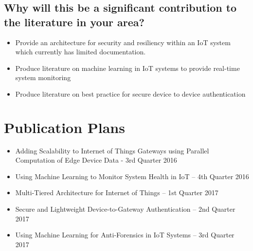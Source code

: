 \documentclass[../main.tex]{subfiles}
\begin{document}
\section{Why will this be a significant contribution to the literature in your area?}

\begin{itemize}
    \item Provide an architecture for security and resiliency within an IoT system which currently has limited documentation.
    \item Produce literature on machine learning in IoT systems to provide real-time system monitoring
    \item Produce literature on best practice for secure device to device authentication
\end{itemize}


\chapter{Publication Plans}

\begin{itemize}
    \item Adding Scalability to Internet of Things Gateways using Parallel Computation of Edge Device Data - 3rd Quarter 2016
    \item Using Machine Learning to Monitor System Health in IoT  – 4th Quarter 2016
    \item Multi-Tiered Architecture for Internet of Things – 1st Quarter 2017
    \item Secure and Lightweight Device-to-Gateway Authentication – 2nd Quarter 2017
    \item Using Machine Learning for Anti-Forensics in IoT Systems – 3rd Quarter 2017
\end{itemize}
\end{document}

